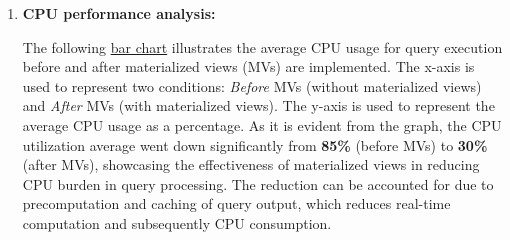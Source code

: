 \begin{enumerate}
\begin{itemize}


\end{itemize} \vspace{.4cm}

    \item \textbf{CPU performance analysis:}

The following \hyperref[fig:cpu_usage]{bar chart} illustrates the average CPU usage for query execution before and after materialized views (MVs) are implemented. The x-axis is used to represent two conditions: \textit{Before} MVs (without materialized views) and \textit{After} MVs (with materialized views). The y-axis is used to represent the average CPU usage as a percentage. As it is evident from the graph, the CPU utilization average went down significantly from \textbf{85\%} (before MVs) to \textbf{30\%} (after MVs), showcasing the effectiveness of materialized views in reducing CPU burden in query processing. The reduction can be accounted for due to precomputation and caching of query output, which reduces real-time computation and subsequently CPU consumption.

%


\end{enumerate}
